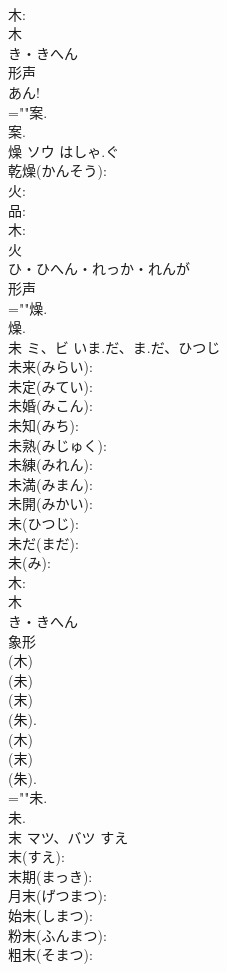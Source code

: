 \documentclass[8pt]{extreport}
\begin{document}
\begin{CJK}{UTF8}{min}
\\	木: 
\\	木	
\\	き・きへん	
\\	形声 
\\	あん!	
\\	=""案.
\\	案.
\\	燥	ソウ	はしゃ.ぐ		
\\	乾燥(かんそう): 
\\	火: 
\\	品: 
\\	木: 
\\	火	
\\	ひ・ひへん・れっか・れんが	
\\	形声 
\\	=""燥.
\\	燥.
\\	未	ミ、ビ	いま.だ、ま.だ、ひつじ		
\\	未来(みらい): 
\\	未定(みてい): 
\\	未婚(みこん): 
\\	未知(みち): 
\\	未熟(みじゅく): 
\\	未練(みれん): 
\\	未満(みまん): 
\\	未開(みかい): 
\\	未(ひつじ): 
\\	未だ(まだ): 
\\	未(み): 
\\	木: 
\\	木	
\\	き・きへん	
\\	象形 
\\	(木) 
\\	(未) 
\\	(末) 
\\	(朱).	
\\	(木) 
\\	(末) 
\\	(朱).	
\\	=""未.
\\	未.
\\	末	マツ、バツ	すえ		
\\	末(すえ): 
\\	末期(まっき): 
\\	月末(げつまつ): 
\\	始末(しまつ): 
\\	粉末(ふんまつ): 
\\	粗末(そまつ): 

\end{CJK}
\end{document}
